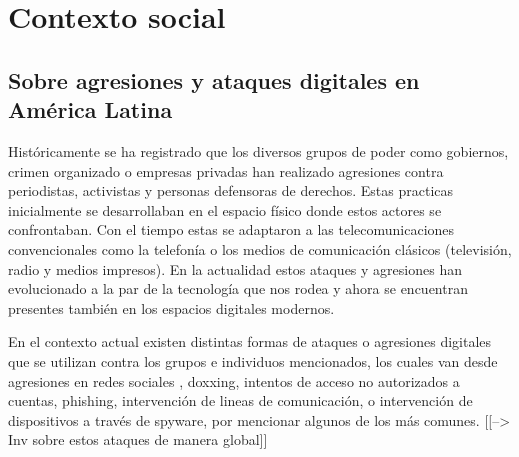 \documentclass[12pt]{caltech_thesis}
\begin{document}



\chapter{Contexto social}

\section{Sobre agresiones y ataques digitales en América Latina}

Históricamente se ha registrado que los diversos grupos de poder como gobiernos, crimen organizado o empresas privadas han realizado agresiones contra periodistas, activistas y personas defensoras de derechos. Estas practicas inicialmente se desarrollaban en el espacio físico donde estos actores se confrontaban. Con el tiempo estas se adaptaron a las telecomunicaciones convencionales como la telefonía o los medios de comunicación clásicos (televisión, radio y medios impresos). En la actualidad estos ataques y agresiones han evolucionado a la par de la tecnología que nos rodea y ahora se encuentran presentes también en los espacios digitales modernos.

En el contexto actual existen distintas formas de ataques o agresiones digitales que se utilizan contra los grupos e individuos mencionados, los cuales van desde agresiones en redes sociales , doxxing, intentos de acceso no autorizados a cuentas, phishing, intervención de lineas de comunicación, o intervención de dispositivos a través de spyware, por mencionar algunos de los más comunes. [[--> Inv sobre estos ataques de manera global]]
\end{document}
